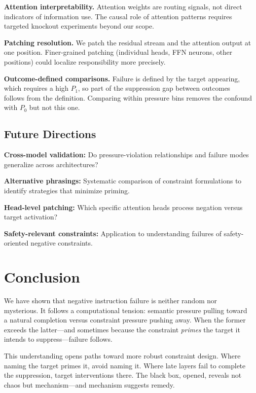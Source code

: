 \documentclass{article}
\begin{document}
\textbf{Attention interpretability.} Attention weights are routing signals, not direct indicators of information use. The causal role of attention patterns requires targeted knockout experiments beyond our scope.

\textbf{Patching resolution.} We patch the residual stream and the attention output at one position. Finer-grained patching (individual heads, FFN neurons, other positions) could localize responsibility more precisely.

\textbf{Outcome-defined comparisons.} Failure is defined by the target appearing, which requires a high $P_1$, so part of the suppression gap between outcomes follows from the definition. Comparing within pressure bins removes the confound with $P_0$ but not this one.

\subsection{Future Directions}

\textbf{Cross-model validation:} Do pressure-violation relationships and failure modes generalize across architectures?

\textbf{Alternative phrasings:} Systematic comparison of constraint formulations to identify strategies that minimize priming.

\textbf{Head-level patching:} Which specific attention heads process negation versus target activation?

\textbf{Safety-relevant constraints:} Application to understanding failures of safety-oriented negative constraints.

\section*{Conclusion}

We have shown that negative instruction failure is neither random nor mysterious. It follows a computational tension: semantic pressure pulling toward a natural completion versus constraint pressure pushing away. When the former exceeds the latter---and sometimes because the constraint \emph{primes} the target it intends to suppress---failure follows.

This understanding opens paths toward more robust constraint design. Where naming the target primes it, avoid naming it. Where late layers fail to complete the suppression, target interventions there. The black box, opened, reveals not chaos but mechanism---and mechanism suggests remedy.
\end{document}
